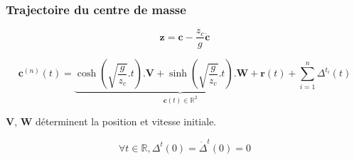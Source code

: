 \documentclass[14pt,utf8,hyperref={pdfpagelabels=false}]{beamer}
\begin{document}
\begin{slideAction}
  \frametitle{Trajectoire du centre de masse}


  \begin{equation*}
    \mathbf{z} = \mathbf{c} - \frac{z_c}{g} \ddot{\mathbf{c}}
  \end{equation*}

  \begin{equation*}
    \mathbf{c}^{(n)}(t) =
    \underbrace{\scriptstyle \cosh(\sqrt{\frac{g}{z_c}}.t) . \mathbf{V} +
      \sinh(\sqrt{\frac{g}{z_c}}.t) . \mathbf{W} +
      \mathbf{r}(t)}_{\mathbf{c}(t) \in \mathbb{R}^2} + \sum_{i=1}^n \Delta^{t_i}(t)
  \end{equation*}

  \begin{center}
    $\mathbf{V}$, $\mathbf{W}$ déterminent la position et vitesse
    initiale.
  \end{center}

  \begin{equation*}
    \forall t \in \mathbb{R}, \Delta^t(0) = \dot{\Delta}^t(0) = 0
  \end{equation*}
\end{slideAction}



\end{document}
